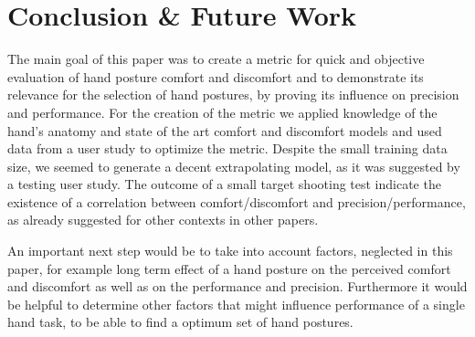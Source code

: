 \documentclass{sig-alternate-05-2015}
\begin{document}
\section{Conclusion \& Future Work}

The main goal of this paper was to create a metric for quick and objective evaluation of hand posture comfort and discomfort and to demonstrate its relevance for the selection of hand postures, by proving its influence on precision and performance. For the creation of the metric we applied knowledge of the hand's anatomy and state of the art comfort and discomfort models and used data from a user study to optimize the metric. Despite the small training data size, we seemed to generate a decent extrapolating model, as it was suggested by a testing user study. The outcome of a small target shooting test indicate the existence of a correlation between comfort/discomfort and precision/performance, as already suggested for other contexts in other papers.

An important next step would be to take into account factors, neglected in this paper, for example long term effect of a hand posture on the perceived comfort and discomfort as well as on the performance and precision. Furthermore it would be helpful to determine other factors that might influence performance of a single hand task, to be able to find a optimum set of hand postures.

%

%
%

\end{document}
